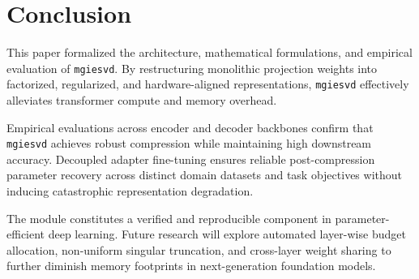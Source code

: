 \section{Conclusion}
This paper formalized the architecture, mathematical formulations, and empirical evaluation of \texttt{mgiesvd}. By restructuring monolithic projection weights into factorized, regularized, and hardware-aligned representations, \texttt{mgiesvd} effectively alleviates transformer compute and memory overhead.

Empirical evaluations across encoder and decoder backbones confirm that \texttt{mgiesvd} achieves robust compression while maintaining high downstream accuracy. Decoupled adapter fine-tuning ensures reliable post-compression parameter recovery across distinct domain datasets and task objectives without inducing catastrophic representation degradation.

The module constitutes a verified and reproducible component in parameter-efficient deep learning. Future research will explore automated layer-wise budget allocation, non-uniform singular truncation, and cross-layer weight sharing to further diminish memory footprints in next-generation foundation models.
